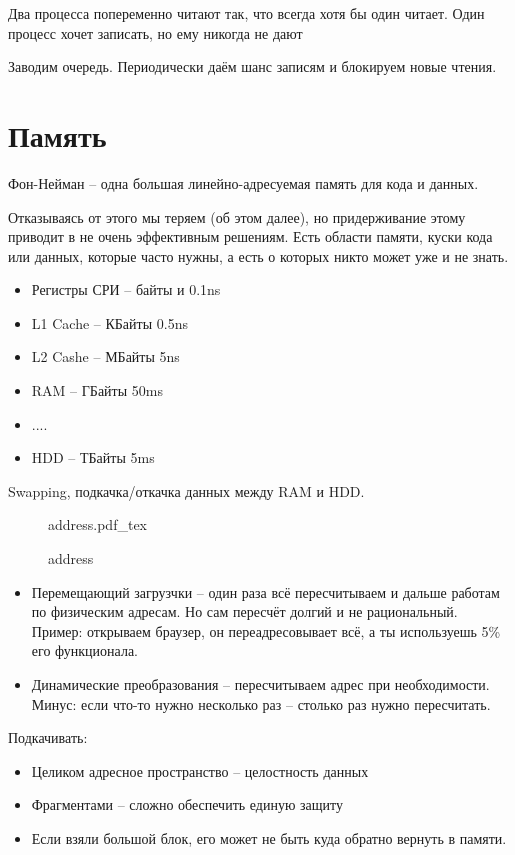 \documentclass{book}
\theoremstyle{definition}
\newcommand{\incfig}[1]{%
    \def\svgwidth{\columnwidth}
    {#1.pdf_tex}
}
\begin{document}
\begin{problem}

    Два процесса попеременно читают так, что всегда хотя бы один читает. Один процесс хочет записать, но ему никогда не дают

    Заводим очередь. Периодически даём шанс записям и блокируем новые чтения.
\end{problem}

\section{Память}

Фон-Нейман -- одна большая линейно-адресуемая память для кода и данных.

Отказываясь от этого мы теряем (об этом далее), но придерживание этому приводит в не очень эффективным решениям. Есть области памяти, куски кода или данных, которые часто нужны, а есть о которых никто может уже и не знать.

\begin{itemize}
    \item Регистры СРИ -- байты и 0.1ns
    \item L1 Cache -- КБайты 0.5ns
    \item L2 Cashe -- МБайты 5ns
    \item RAM -- ГБайты 50ms
    \item ....
    \item HDD -- ТБайты 5ms
\end{itemize}

Swapping, подкачка/откачка данных между RAM и HDD.

\begin{figure}[!ht]
    \centering
    \incfig{address}
    \caption{address}
    \label{fig:address}
\end{figure}

\begin{itemize}
    \item Перемещающий загрузчки -- один раза всё пересчитываем и дальше работам по физическим адресам. Но сам пересчёт долгий и не рациональный. Пример: открываем браузер, он переадресовывает всё, а ты используешь 5\% его функционала.
    \item Динамические преобразования -- пересчитываем адрес при необходимости. Минус: если что-то нужно несколько раз -- столько раз нужно пересчитать.
\end{itemize}

Подкачивать:
\begin{itemize}
    \item Целиком адресное пространство -- целостность данных
    \item Фрагментами -- сложно обеспечить единую защиту
    \item Если взяли большой блок, его может не быть куда обратно вернуть в памяти.
\end{itemize}
\end{document}
